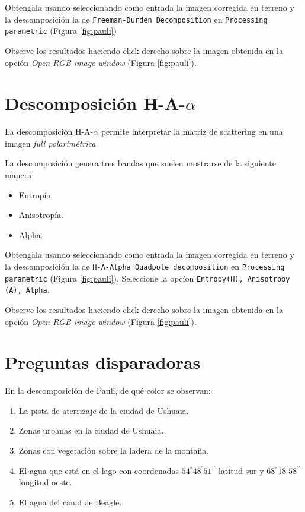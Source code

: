 Obtengala usando  seleccionando como entrada la imagen corregida en terreno y la descomposición la de \texttt{Freeman-Durden Decomposition} en \texttt{Processing parametric} (Figura \ref{fig:pauli})

Observe los resultados haciendo click derecho sobre la imagen obtenida en la opción \emph{Open RGB image window} (Figura \ref{fig:pauli}).

\section{Descomposición H-A-$\alpha$}

La descomposición H-A-$\alpha$ permite interpretar la matriz de scattering en una imagen \emph{full polarimétrica}

La descomposición genera tres bandas que suelen mostrarse de la siguiente manera:

\begin{itemize}
    \item Entropía.
    \item Anisotropía.
    \item Alpha.
\end{itemize}

Obtengala usando  seleccionando como entrada la imagen corregida en terreno y la descomposición la de \texttt{H-A-Alpha Quadpole decomposition} en \texttt{Processing parametric} (Figura \ref{fig:pauli}). Seleccione la opcíon \texttt{Entropy(H), Anisotropy (A), Alpha}.

Observe los resultados haciendo click derecho sobre la imagen obtenida en la opción \emph{Open RGB image window} (Figura \ref{fig:pauli}).


\section{Preguntas disparadoras}

\begin{que}
    En la descomposición de Pauli, de qué color  se observan:
    \begin{enumerate}
        \item La pista de aterrizaje de la ciudad de Ushuaia.
        \item Zonas urbanas en la ciudad de Ushuaia.
        \item Zonas con vegetación sobre la ladera de la montaña.
        \item El agua que está en el lago con coordenadas $54^\circ 48^\prime 51^{\prime\prime}$ latitud sur y $68^\circ 18^\prime 58^{\prime\prime}$ longitud oeste.
        \item El agua del canal de Beagle.
    \end{enumerate}
\end{que}

